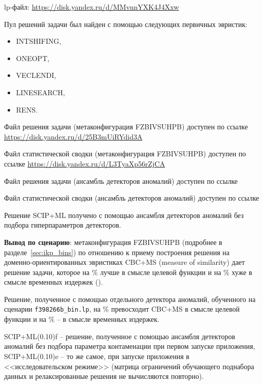 \documentclass[%
	11pt,
	a4paper,
	utf8,
		]{article}
\begin{document}
lp-файл: \url{https://disk.yandex.ru/d/MMvnnYXK4J4Xxw}

Пул решений задачи был найден с помощью следующих первичных эвристик:
\begin{itemize}
	\item INTSHIFING,
	
	\item ONEOPT,
	
	\item VECLENDI,
	
	\item LINESEARCH,
	
	\item RENS.
\end{itemize}



Файл решения задачи (метаконфигурация FZBIVSUHPB) доступен по ссылке \url{https://disk.yandex.ru/d/25B3mUiRYdid3A}

Файл статистической сводки (метаконфигурация FZBIVSUHPB) доступен по ссылке \url{https://disk.yandex.ru/d/L3TyaXp56rZjCA}

Файл решения задачи (ансамбль детекторов аномалий) доступен по ссылке \url{}

Файл статистической сводки (ансамбль детекторов аномалий) доступен по ссылке \url{}

Решение SCIP+ML получено с помощью ансамбля детекторов аномалий без подбора гиперпараметров детекторов.

\vspace*{3mm}
\textbf{Вывод по сценарию}: метаконфигурация FZBIVSUHPB (подробнее в разделе~\ref{sec:ikp_bins}) по отношению к приему построения решения на доменно-ориентированных эвристиках CBC+MS (measure of similarity) дает решение задачи, которое на \% лучше в смысле целевой функции и на  \% хуже в смысле временных издержек ().

Решение, полученное с помощью отдельного детектора аномалий, обученного на сценарии \texttt{f398266b\_bin.lp}, на \% превосходит CBC+MS в смысле целевой функции и на \% -- в смысле временных издержек.

SCIP+ML(0.10)f -- решение, полученное с помощью ансамбля детекторов аномалий без подбора параметра контаменации при первом запуске приложения, SCIP+ML(0.10)e -- то же самое, при запуске приложения в <<исследовательском режиме>> (матрица ограничений обучающего поднабора данных и релаксированные решения не вычисляются повторно).
\end{document}
